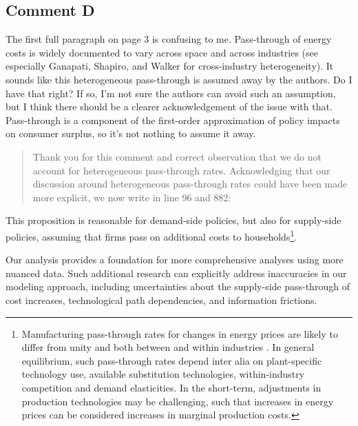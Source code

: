 \documentclass[11pt]{article}
\newenvironment{response}
{\begin{quote}\color{black}}
{\end{quote}}
\begin{document}
\subsection*{Comment D}\label{comment_R1_D}

\begin{commentbox}
    The first full paragraph on page 3 is confusing to me. Pass-through of energy costs is widely documented to vary across space and across industries (see especially Ganapati, Shapiro, and Walker for cross-industry heterogeneity). It sounds like this heterogeneous pass-through is assumed away by the authors. Do I have that right? If so, I'm not sure the authors can avoid such an assumption, but I think there should be a clearer acknowledgement of the issue with that. Pass-through is a component of the first-order approximation of policy impacts on consumer surplus, so it's not nothing to assume it away.
\end{commentbox}

\begin{response}
    Thank you for this comment and correct observation that we do not account for heterogeneous pass-through rates. Acknowledging that our discussion around heterogeneous pass-through rates could have been made more explicit, we now write in line 96 and 882:
\end{response}

\begin{revisionbox}
    This proposition is reasonable for demand-side policies, but also for supply-side policies, assuming that firms pass on additional costs to households\footnote{Manufacturing pass-through rates for changes in energy prices are likely to differ from unity and both between and within industries \autocite{Ganapati.2020,Cludius.2020}. In general equilibrium, such pass-through rates depend inter alia on plant-specific technology use, available substitution technologies, within-industry competition and demand elasticities. In the short-term, adjustments in production technologies may be challenging, such that increases in energy prices can be considered increases in marginal production costs.}.
\end{revisionbox}

\begin{revisionbox}
    Our analysis provides a foundation for more comprehensive analyses using more nuanced data. Such additional research can explicitly address inaccuracies in our modeling approach, including uncertainties about the supply-side pass-through of cost increases, technological path dependencies, and information frictions.
\end{revisionbox}
\end{document}
